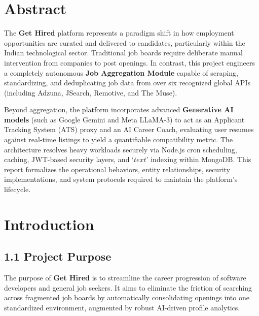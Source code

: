 \documentclass[12pt,a4paper,oneside]{report}
\begin{document}
\chapter*{Abstract}
The \textbf{Get Hired} platform represents a paradigm shift in how employment opportunities are curated and delivered to candidates, particularly within the Indian technological sector. Traditional job boards require deliberate manual intervention from companies to post openings. In contrast, this project engineers a completely autonomous \textbf{Job Aggregation Module} capable of scraping, standardizing, and deduplicating job data from over six recognized global APIs (including Adzuna, JSearch, Remotive, and The Muse). 

Beyond aggregation, the platform incorporates advanced \textbf{Generative AI models} (such as Google Gemini and Meta LLaMA-3) to act as an Applicant Tracking System (ATS) proxy and an AI Career Coach, evaluating user resumes against real-time listings to yield a quantifiable compatibility metric. The architecture resolves heavy workloads securely via Node.js cron scheduling, caching, JWT-based security layers, and `$text$' indexing within MongoDB. This report formalizes the operational behaviors, entity relationships, security implementations, and system protocols required to maintain the platform's lifecycle.

\newpage

\tableofcontents
\newpage
\listoftables
\newpage
\listoffigures
\newpage
{}

\chapter{Introduction}

\section{1.1 Project Purpose}
The purpose of \textbf{Get Hired} is to streamline the career progression of software developers and general job seekers. It aims to eliminate the friction of searching across fragmented job boards by automatically consolidating openings into one standardized environment, augmented by robust AI-driven profile analytics. 
\end{document}
